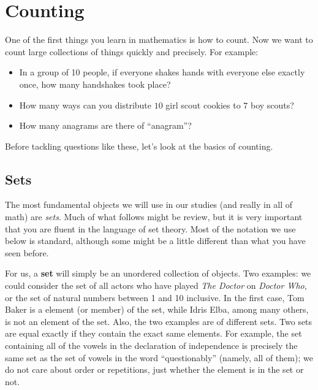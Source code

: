 \documentclass[11pt,]{book}
\newcommand{\terminology}[1]{\textbf{#1}}
\theoremstyle{ptxplainnotitle}
\theoremstyle{ptxplaintitle}
\theoremstyle{ptxdefinitionnotitle}
\theoremstyle{ptxdefinitiontitle}
\theoremstyle{ptxdefinitionnotitle}
\theoremstyle{ptxdefinitiontitle}
\theoremstyle{ptxdefinitionnotitle}
\theoremstyle{ptxdefinitiontitle}
\theoremstyle{ptxdefinitiontitlenonumber}
\theoremstyle{ptxdefinitiontitlenonumber}
\numberwithin{equation}{chapter}
\begin{document}
\chapter[{Counting}]{Counting}\label{ch_counting}
\hypertarget{p-669}{}%
One of the first things you learn in mathematics is how to count. Now we want to count large collections of things quickly and precisely. For example: \leavevmode%
\begin{itemize}[label=\textbullet]
\item{}\hypertarget{p-670}{}%
In a group of 10 people, if everyone shakes hands with everyone else exactly once, how many handshakes took place?%
\item{}\hypertarget{p-671}{}%
How many ways can you distribute \(10\) girl scout cookies to \(7\) boy scouts?%
\item{}\hypertarget{p-672}{}%
How many anagrams are there of ``anagram''?%
\end{itemize}
%
\par
\hypertarget{p-673}{}%
Before tackling questions like these, let's look at the basics of counting.%
\typeout{************************************************}
\typeout{************************************************}
\section[{Sets}]{Sets}\label{sec_intro-sets}
\hypertarget{p-674}{}%
The most fundamental objects we will use in our studies (and really in all of math) are \emph{sets}. Much of what follows might be review, but it is very important that you are fluent in the language of set theory. Most of the notation we use below is standard, although some might be a little different than what you have seen before.%
\par
\hypertarget{p-675}{}%
For us, a \terminology{set}  will simply be an unordered collection of objects. Two examples: we could consider the set of all actors who have played \emph{The Doctor} on \emph{Doctor Who}, or the set of natural numbers between 1 and 10 inclusive. In the first case, Tom Baker is a element (or member) of the set, while Idris Elba, among many others, is not an element of the set. Also, the two examples are of different sets. Two sets are equal exactly if they contain the exact same elements. For example, the set containing all of the vowels in the declaration of independence is precisely the same set as the set of vowels in the word ``questionably'' (namely, all of them); we do not care about order or repetitions, just whether the element is in the set or not.%
\typeout{************************************************}
\typeout{************************************************}
\end{document}

